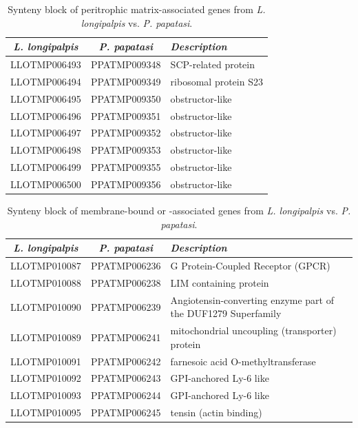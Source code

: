 \begin{table}[H]
  \centering
  \begin{tabular}{c c l} \hline
    \emph{L. longipalpis} & \emph{P. papatasi} & \emph{Description} \\ \hline
    LLOTMP006493 & PPATMP009348 & SCP-related protein \\
    LLOTMP006494 & PPATMP009349 & ribosomal protein S23 \\
    LLOTMP006495 & PPATMP009350 & obstructor-like \\
    LLOTMP006496 & PPATMP009351 & obstructor-like \\
    LLOTMP006497 & PPATMP009352 & obstructor-like \\
    LLOTMP006498 & PPATMP009353 & obstructor-like \\
    LLOTMP006499 & PPATMP009355 & obstructor-like \\
    LLOTMP006500 & PPATMP009356 & obstructor-like
  \end{tabular}
  \caption{Synteny block of peritrophic matrix-associated genes from \emph{L. longipalpis} vs. \emph{P. papatasi}.}
  \label{tab:synteny-llot-ppat-peritrophic}
\end{table}

\begin{table}[H]
  \centering
  \begin{tabular}{c c l} \hline
    \emph{L. longipalpis} & \emph{P. papatasi} & \emph{Description} \\ \hline
    LLOTMP010087 & PPATMP006236 & G Protein-Coupled Receptor (GPCR) \\
    LLOTMP010088 & PPATMP006238 & LIM containing protein \\
    LLOTMP010090 & PPATMP006239 & Angiotensin-converting enzyme part of the DUF1279 Superfamily \\
    LLOTMP010089 & PPATMP006241 & mitochondrial uncoupling (transporter) protein \\
    LLOTMP010091 & PPATMP006242 & farnesoic acid O-methyltransferase \\
    LLOTMP010092 & PPATMP006243 & GPI-anchored Ly-6 like \\
    LLOTMP010093 & PPATMP006244 & GPI-anchored Ly-6 like \\
    LLOTMP010095 & PPATMP006245 & tensin (actin binding)
    \end{tabular}
    \caption{Synteny block of membrane-bound or -associated genes from \emph{L. longipalpis} vs. \emph{P. papatasi}.}
  \label{tab:synteny-llot-ppat-membrane}
\end{table}

